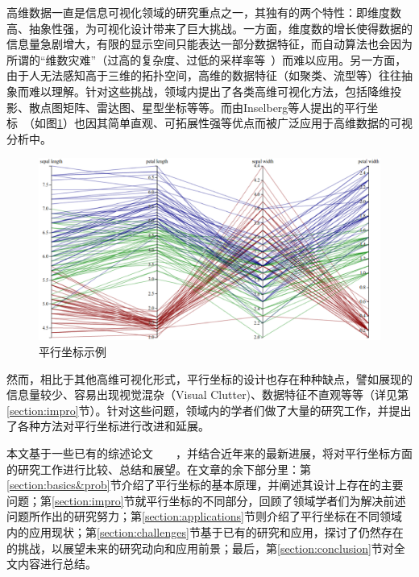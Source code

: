 \documentclass[12pt,twocolumn]{article}
\begin{document}
高维数据一直是信息可视化领域的研究重点之一，其独有的两个特性：即维度数高、抽象性强，为可视化设计带来了巨大挑战。一方面，维度数的增长使得数据的信息量急剧增大，有限的显示空间只能表达一部分数据特征，而自动算法也会因为所谓的“维数灾难”（过高的复杂度、过低的采样率等~\citep{Bellman1962}）而难以应用。另一方面，由于人无法感知高于三维的拓扑空间，高维的数据特征（如聚类、流型等）往往抽象而难以理解。针对这些挑战，领域内提出了各类高维可视化方法\citep{grinstein2001high}，包括降维投影\citep{fodor2002survey}、散点图矩阵\citep{cleveland1988dynamic}、雷达图\citep{hoffman1999dimensional}、星型坐标\citep{kandogan2000star}等等。而由Inselberg等人提出的平行坐标~\citep{inselberg1985plane}（如图\ref{fig:PC_demo}）也因其简单直观、可拓展性强等优点而被广泛应用于高维数据的可视分析中。

\begin{figure}[htb!]
\centering
\includegraphics[width=1.0\linewidth]{images/PC_demo.eps}
\caption{\label{fig:PC_demo}平行坐标示例
}
\end{figure}

然而，相比于其他高维可视化形式，平行坐标的设计也存在种种缺点，譬如展现的信息量较少、容易出现视觉混杂（Visual Clutter)、数据特征不直观等等（详见第\ref{section:impro}节）。针对这些问题，领域内的学者们做了大量的研究工作，并提出了各种方法对平行坐标进行改进和延展。

本文基于一些已有的综述论文~\citep{grinstein2001high}~\citep{heinrich2013state}~\citep{siirtola2006interacting}~\citep{wong199430}，并结合近年来的最新进展，将对平行坐标方面的研究工作进行比较、总结和展望。在文章的余下部分里：第\ref{section:basics&prob}节介绍了平行坐标的基本原理，并阐述其设计上存在的主要问题；第\ref{section:impro}节就平行坐标的不同部分，回顾了领域学者们为解决前述问题所作出的研究努力；第\ref{section:applications}节则介绍了平行坐标在不同领域内的应用现状；第\ref{section:challenges}节基于已有的研究和应用，探讨了仍然存在的挑战，以展望未来的研究动向和应用前景；最后，第\ref{section:conclusion}节对全文内容进行总结。
\end{document}
